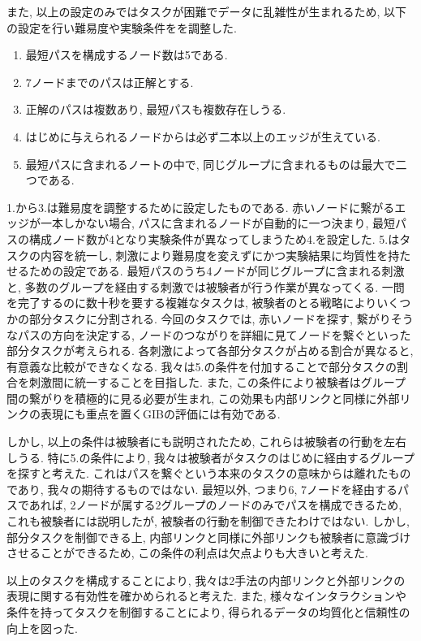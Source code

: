 \documentclass{kuee}
\begin{document}
また, 以上の設定のみではタスクが困難でデータに乱雑性が生まれるため, 以下の設定を行い難易度や実験条件をを調整した.
\begin{enumerate}
  \item 最短パスを構成するノード数は5である.
  \item 7ノードまでのパスは正解とする.
  \item 正解のパスは複数あり, 最短パスも複数存在しうる.
  \item はじめに与えられるノードからは必ず二本以上のエッジが生えている.
  \item 最短パスに含まれるノートの中で, 同じグループに含まれるものは最大で二つである.
\end{enumerate}
1.から3.は難易度を調整するために設定したものである.
赤いノードに繋がるエッジが一本しかない場合, パスに含まれるノードが自動的に一つ決まり, 最短パスの構成ノード数が4となり実験条件が異なってしまうため4.を設定した.
5.はタスクの内容を統一し, 刺激により難易度を変えずにかつ実験結果に均質性を持たせるための設定である.
最短パスのうち4ノードが同じグループに含まれる刺激と, 多数のグループを経由する刺激では被験者が行う作業が異なってくる.
一問を完了するのに数十秒を要する複雑なタスクは, 被験者のとる戦略によりいくつかの部分タスクに分割される.
今回のタスクでは, 赤いノードを探す, 繋がりそうなパスの方向を決定する, ノードのつながりを詳細に見てノードを繋ぐといった部分タスクが考えられる.
各刺激によって各部分タスクが占める割合が異なると, 有意義な比較ができなくなる.
我々は5.の条件を付加することで部分タスクの割合を刺激間に統一することを目指した.
また, この条件により被験者はグループ間の繋がりを積極的に見る必要が生まれ, この効果も内部リンクと同様に外部リンクの表現にも重点を置くGIBの評価には有効である.

しかし, 以上の条件は被験者にも説明されたため, これらは被験者の行動を左右しうる.
特に5.の条件により, 我々は被験者がタスクのはじめに経由するグループを探すと考えた.
これはパスを繋ぐという本来のタスクの意味からは離れたものであり, 我々の期待するものではない.
最短以外, つまり6, 7ノードを経由するパスであれば, 2ノードが属する2グループのノードのみでパスを構成できるため, これも被験者には説明したが, 被験者の行動を制御できたわけではない.
しかし, 部分タスクを制御できる上, 内部リンクと同様に外部リンクも被験者に意識づけさせることができるため, この条件の利点は欠点よりも大きいと考えた.

以上のタスクを構成することにより, 我々は2手法の内部リンクと外部リンクの表現に関する有効性を確かめられると考えた.
また, 様々なインタラクションや条件を持ってタスクを制御することにより, 得られるデータの均質化と信頼性の向上を図った.
\end{document}
